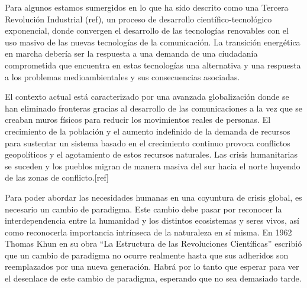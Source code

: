 Para algunos estamos sumergidos en lo que ha sido descrito como una Tercera Revolución Industrial (ref), un proceso de desarrollo científico-tecnológico exponencial, donde convergen el desarrollo de las tecnologías renovables con el uso masivo de las nuevas tecnologías de la comunicación. La transición energética en marcha debería ser la respuesta a una demanda de una ciudadanía comprometida que encuentra en estas tecnologías una alternativa y una respuesta a los problemas medioambientales y sus consecuencias asociadas. 

El contexto actual está caracterizado por una avanzada globalización donde se han eliminado fronteras gracias al desarrollo de las comunicaciones a la vez que se creaban muros físicos para reducir los movimientos reales de personas. El crecimiento de la población y el aumento indefinido de la demanda de recursos para sustentar un sistema basado en el crecimiento continuo provoca conflictos geopolíticos y el agotamiento de estos recursos naturales. Las crisis humanitarias se suceden y los pueblos migran de manera masiva del sur hacia el norte huyendo de las zonas de conflicto.[ref] 

Para poder abordar las necesidades humanas en una coyuntura de crisis global, es necesario un cambio de paradigma. Este cambio debe pasar por reconocer la interdependencia entre la humanidad y los distintos ecosistemas y seres vivos, así como reconocerla importancia intrínseca de la naturaleza en sí misma. En 1962 Thomas Khun en su obra ``La Estructura de las Revoluciones Científicas'' escribió que un cambio de paradigma no ocurre realmente hasta que sus adheridos son reemplazados por una nueva generación. Habrá por lo tanto que esperar para ver el desenlace de este cambio de paradigma, esperando que no sea demasiado tarde.





